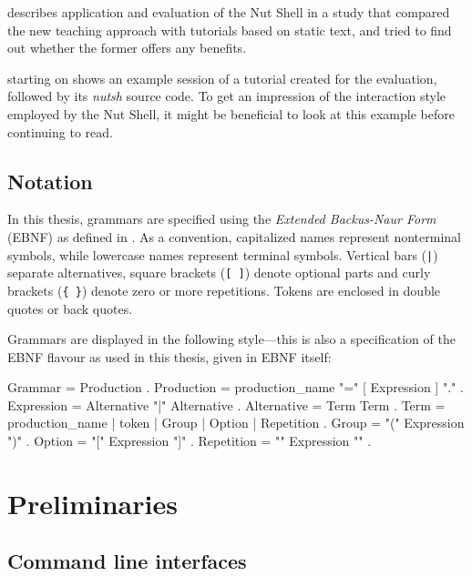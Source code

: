 \documentclass[paper=a4,twoside,abstract=on,cleardoublepage=empty,numbers=noenddot,toc=bib,toc=listof,12pt,appendixprefix=true]{scrreprt}
\begin{document}
 describes application and evaluation of the Nut Shell in a study that compared the new teaching approach with tutorials based on static text, and tried to find out whether the former offers any benefits.


 starting on  shows an example session of a tutorial created for the evaluation, followed by its \emph{nutsh} source code. To get an impression of the interaction style employed by the Nut Shell, it might be beneficial to look at this example before continuing to read.


\section{Notation}
\label{sec:ebnf}

In this thesis, grammars are specified using the \emph{Extended Backus-Naur Form} (EBNF) as defined in \cite{wirth77}. As a convention, capitalized names represent nonterminal symbols, while lowercase names represent terminal symbols. Vertical bars (\texttt{|}) separate alternatives, square brackets (\texttt{[ ]}) denote optional parts and curly brackets (\texttt{\{ \}}) denote zero or more repetitions. Tokens are enclosed in double quotes or back quotes.

Grammars are displayed in the following style---this is also a specification of the EBNF flavour as used in this thesis, given in EBNF itself:

\begin{ebnf}
Grammar     = { Production } .
Production  = production_name "=" [ Expression ] "." .
Expression  = Alternative { "|" Alternative } .
Alternative = Term { Term } .
Term        = production_name | token | Group | Option | Repetition .
Group       = "(" Expression ")" .
Option      = "[" Expression "]" .
Repetition  = "{" Expression "}" .
\end{ebnf}

\chapter{Preliminaries}
\label{sec:preliminaries}

\section{Command line interfaces}
\label{sec:cli}
\end{document}
